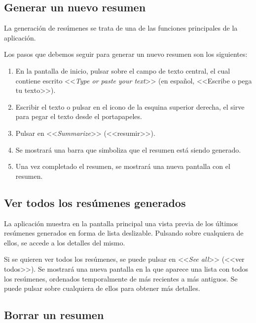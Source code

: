 \subsection{Generar un nuevo resumen}

La generación de resúmenes se trata de una de las funciones principales de la aplicación.

Los pasos que debemos seguir para generar un nuevo resumen son los siguientes:

\begin{enumerate}
	\item En la pantalla de inicio, pulsar sobre el campo de texto central, el cual contiene escrito <<\emph{Type or paste your text}>> (en español, <<Escribe o pega tu texto>>).
	
	\item Escribir el texto o pulsar en el icono de la esquina superior derecha, el sirve para pegar el texto desde el portapapeles.
	
	\item Pulsar en <<\emph{Summarize}>> (<<resumir>>).
	
	\item Se mostrará una barra que simboliza que el resumen está siendo generado.
	
	\item Una vez completado el resumen, se mostrará una nueva pantalla con el resumen.
\end{enumerate}


\subsection{Ver todos los resúmenes generados}

La aplicación muestra en la pantalla principal una vista previa de los últimos resúmenes generados en forma de lista deslizable. Pulsando sobre cualquiera de ellos, se accede a los detalles del mismo.

Si se quieren ver todos los resúmenes, se puede pulsar en <<\emph{See all}>> (<<ver todos>>). Se mostrará una nueva pantalla en la que aparece una lista con todos los resúmenes, ordenados temporalmente de más recientes a más antiguos. Se puede pulsar sobre cualquiera de ellos para obtener más detalles.


\subsection{Borrar un resumen} \label{subsection:borrar}

